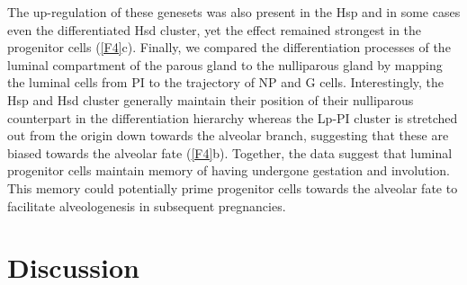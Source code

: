 \documentclass[titlepage, 12pt, oneside]{amsart}
\begin{document}
The up-regulation of these genesets was also present in the Hsp and in some cases even the differentiated Hsd cluster, yet the effect remained strongest in the progenitor cells (\autoref{F4}c).
Finally, we compared the differentiation processes of the luminal compartment of the parous gland to the nulliparous gland by mapping the luminal cells from PI to the trajectory of NP and G cells.
Interestingly, the Hsp and Hsd cluster generally maintain their position of their nulliparous counterpart in the differentiation hierarchy whereas the Lp-PI cluster is stretched out from the origin down towards the alveolar branch, suggesting that these are biased towards the alveolar fate (\autoref{F4}b).
Together, the data suggest that luminal progenitor cells maintain memory of having undergone gestation and involution.
This memory could potentially prime progenitor cells towards the alveolar fate to facilitate alveologenesis in subsequent pregnancies.

\section{Discussion}
\end{document}
